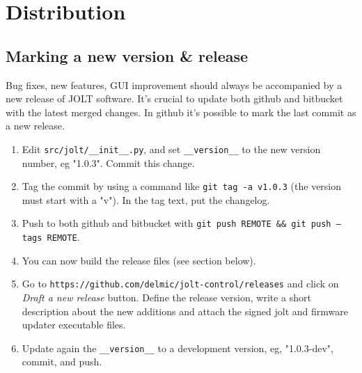 \documentclass[]{article}
\begin{document}
\section{Distribution}

\subsection{Marking a new version \& release}

Bug fixes, new features, GUI improvement should always be accompanied by a new release of JOLT software. It's crucial to update both github and bitbucket with the latest merged changes.
In github it's possible to mark the last commit as a new release.
\begin{enumerate}
    \item Edit \texttt{src/jolt/\_\_init\_\_.py}, and set \texttt{\_\_version\_\_} to the new version number, eg "1.0.3".
    Commit this change.
    \item Tag the commit by using a command like \texttt{git tag -a v1.0.3} (the version must start with a "v").
    In the tag text, put the changelog.
    \item Push to both github and bitbucket with \texttt{git push REMOTE \&\& git push --tags REMOTE}.
    \item You can now build the release files (see section below).
    \item Go to \texttt{https://github.com/delmic/jolt-control/releases} and click on \emph{Draft a new release} button.
    Define the release version, write a short description about the new additions and attach the signed jolt and firmware updater executable files.
    \item Update again the \texttt{\_\_version\_\_} to a development version, eg, "1.0.3-dev", commit, and push.
\end{enumerate}
\end{document}
